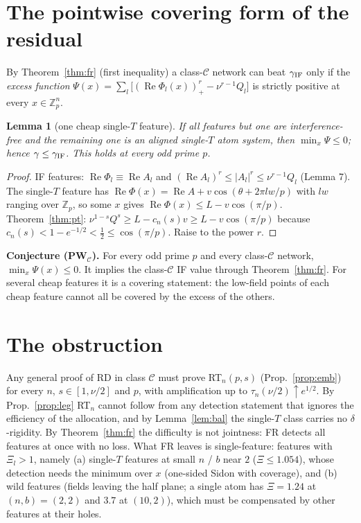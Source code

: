 \documentclass[11pt]{article}
\newtheorem{lemma}[theorem]{Lemma}
\theoremstyle{remark}
\renewcommand{\Re}{\operatorname{Re}}
\begin{document}
\section{The pointwise covering form of the residual}
By Theorem~\ref{thm:fr} (first inequality) a class-$\mathcal C$ network can beat $\gamma_{\rm IF}$ only if the \emph{excess function}
$\Psi(x)=\sum_l\big[(\Re\Phi_l(x))_+^r-\nu^{r-1}Q_l\big]$ is strictly positive at every $x\in\mathbb Z_p^n$.
\begin{lemma}[one cheap single-$T$ feature]
If all features but one are interference-free and the remaining one is an aligned single-$T$ atom system, then $\min_x\Psi\le0$;
hence $\gamma\le\gamma_{\rm IF}$. This holds at every odd prime $p$.
\end{lemma}
\begin{proof}
IF features: $\Re\Phi_l\equiv\Re A_l$ and $(\Re A_l)^r\le|A_l|^r\le\nu^{r-1}Q_l$ (Lemma 7). The single-$T$ feature has
$\Re\Phi(x)=\Re A+v\cos(\theta+2\pi lw/p)$ with $lw$ ranging over $\mathbb Z_p$, so some $x$ gives $\Re\Phi(x)\le L-v\cos(\pi/p)$.
Theorem~\ref{thm:pt}: $\nu^{1-s}Q^s\ge L-c_n(s)v\ge L-v\cos(\pi/p)$ because $c_n(s)<1-e^{-1/2}<\frac12\le\cos(\pi/p)$. Raise to the power $r$.
\end{proof}
\noindent\textbf{Conjecture (PW$_{\mathcal C}$).} For every odd prime $p$ and every class-$\mathcal C$ network, $\min_x\Psi(x)\le0$.
It implies the class-$\mathcal C$ IF value through Theorem~\ref{thm:fr}. For several cheap features it is a covering statement: the
low-field points of each cheap feature cannot all be covered by the excess of the others.

\section{The obstruction}
Any general proof of RD in class $\mathcal C$ must prove RT$_n(p,s)$ (Prop.~\ref{prop:emb}) for every $n$, $s\in[1,\nu/2]$ and $p$, with
amplification up to $\tau_n(\nu/2)\uparrow e^{1/2}$. By Prop.~\ref{prop:leg} RT$_n$ cannot follow from any detection statement that ignores the
efficiency of the allocation, and by Lemma~\ref{lem:bal} the single-$T$ class carries no $\delta$-rigidity. By Theorem~\ref{thm:fr} the
difficulty is not jointness: FR detects all features at once with no loss. What FR leaves is single-feature: features with $\Xi_l>1$,
namely (a) single-$T$ features at small $n$ / $b$ near $2$ ($\Xi\le1.054$), whose detection needs the minimum over $x$ (one-sided Sidon with
coverage), and (b) wild features (fields leaving the half plane; a single atom has $\Xi=1.24$ at $(n,b)=(2,2)$ and $3.7$ at $(10,2)$), which must be compensated by
other features at their holes.
\end{document}
